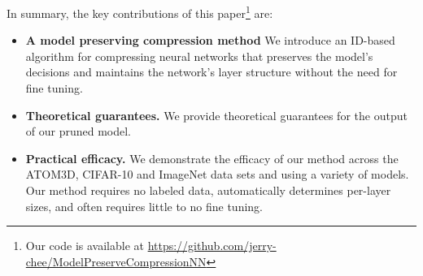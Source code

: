In summary, the key contributions of this paper\footnote{Our code is available at \href{https://github.com/jerry-chee/ModelPreserveCompressionNN}{https://github.com/jerry-chee/ModelPreserveCompressionNN}} are:
\begin{itemize}[leftmargin=*]
    \item[] \textbf{A model preserving compression method}
    We introduce an ID-based algorithm for compressing neural networks that preserves the model's decisions and maintains the network's layer structure without the need for fine tuning.
    \item[] \textbf{Theoretical guarantees.} 
    We provide theoretical guarantees for the output of our pruned model.
    \item[] \textbf{Practical efficacy.}  We demonstrate the efficacy of our method across the ATOM3D, CIFAR-10 and ImageNet data sets and using a variety of models.
    Our method requires no labeled data, automatically determines per-layer sizes, and often requires little to no fine tuning.
\end{itemize}



